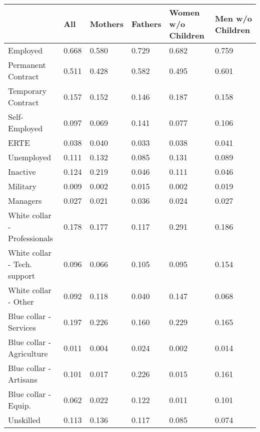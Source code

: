 \begin{tabular}{llllll}
\toprule
{} &     All & Mothers & Fathers & Women w/o Children & Men w/o Children \\
\midrule
Employed                     &   0.668 &   0.580 &   0.729 &              0.682 &            0.759 \\
Permanent Contract           &   0.511 &   0.428 &   0.582 &              0.495 &            0.601 \\
Temporary Contract           &   0.157 &   0.152 &   0.146 &              0.187 &            0.158 \\
Self-Employed                &   0.097 &   0.069 &   0.141 &              0.077 &            0.106 \\
ERTE                         &   0.038 &   0.040 &   0.033 &              0.038 &            0.041 \\
Unemployed                   &   0.111 &   0.132 &   0.085 &              0.131 &            0.089 \\
Inactive                     &   0.124 &   0.219 &   0.046 &              0.111 &            0.046 \\
Military                     &   0.009 &   0.002 &   0.015 &              0.002 &            0.019 \\
Managers                     &   0.027 &   0.021 &   0.036 &              0.024 &            0.027 \\
White collar - Professionals &   0.178 &   0.177 &   0.117 &              0.291 &            0.186 \\
White collar - Tech. support &   0.096 &   0.066 &   0.105 &              0.095 &            0.154 \\
White collar - Other         &   0.092 &   0.118 &   0.040 &              0.147 &            0.068 \\
Blue collar - Services       &   0.197 &   0.226 &   0.160 &              0.229 &            0.165 \\
Blue collar - Agriculture    &   0.011 &   0.004 &   0.024 &              0.002 &            0.014 \\
Blue collar - Artisans       &   0.101 &   0.017 &   0.226 &              0.015 &            0.161 \\
Blue collar - Equip.         &   0.062 &   0.022 &   0.122 &              0.011 &            0.101 \\
Unskilled                    &   0.113 &   0.136 &   0.117 &              0.085 &            0.074 \\

\end{tabular}
